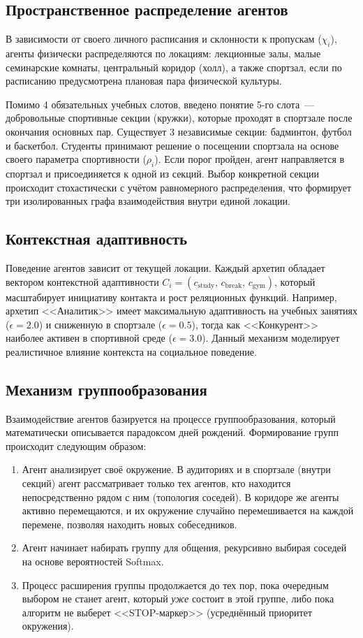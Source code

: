 \documentclass[12pt]{article}
\begin{document}
\subsection{Пространственное распределение агентов}

В зависимости от своего личного расписания и склонности к пропускам ($\chi_i$), агенты физически распределяются по локациям: лекционные залы, малые семинарские комнаты, центральный коридор (холл), а также спортзал, если по расписанию предусмотрена плановая пара физической культуры.

Помимо 4 обязательных учебных слотов, введено понятие 5-го слота~--- добровольные спортивные секции (кружки), которые проходят в спортзале после окончания основных пар. Существует 3 независимые секции: бадминтон, футбол и баскетбол. Студенты принимают решение о посещении спортзала на основе своего параметра спортивности ($\rho_i$). Если порог пройден, агент направляется в спортзал и присоединяется к одной из секций. Выбор конкретной секции происходит стохастически с учётом равномерного распределения, что формирует три изолированных графа взаимодействия внутри единой локации.

\subsection{Контекстная адаптивность}

Поведение агентов зависит от текущей локации. Каждый архетип обладает вектором контекстной адаптивности $C_i = (c_{\text{study}},\, c_{\text{break}},\, c_{\text{gym}})$, который масштабирует инициативу контакта и рост реляционных функций. Например, архетип <<Аналитик>> имеет максимальную адаптивность на учебных занятиях ($\epsilon = 2.0$) и сниженную в спортзале ($\epsilon = 0.5$), тогда как <<Конкурент>> наиболее активен в спортивной среде ($\epsilon = 3.0$). Данный механизм моделирует реалистичное влияние контекста на социальное поведение.

\subsection{Механизм группообразования}

Взаимодействие агентов базируется на процессе группообразования, который математически описывается парадоксом дней рождений. Формирование групп происходит следующим образом:
\begin{enumerate}
    \item Агент анализирует своё окружение. В аудиториях и в спортзале (внутри секций) агент рассматривает только тех агентов, кто находится непосредственно рядом с ним (топология соседей). В коридоре же агенты активно перемещаются, и их окружение случайно перемешивается на каждой перемене, позволяя находить новых собеседников.
    \item Агент начинает набирать группу для общения, рекурсивно выбирая соседей на основе вероятностей Softmax.
    \item Процесс расширения группы продолжается до тех пор, пока очередным выбором не станет агент, который \textit{уже} состоит в этой группе, либо пока алгоритм не выберет <<STOP-маркер>> (усреднённый приоритет окружения).
\end{enumerate}
\end{document}
